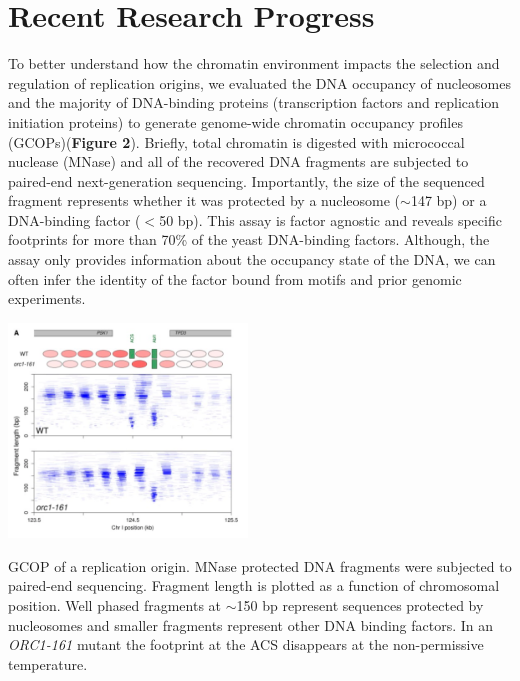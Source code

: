 \section{Recent Research Progress}
To better understand how the chromatin environment impacts the selection and regulation of replication origins, we evaluated the DNA occupancy of nucleosomes and the majority of DNA-binding proteins (\eg transcription factors and replication initiation proteins) to generate genome-wide chromatin occupancy profiles (GCOPs)({\color{dukeblue}\textbf{Figure 2}}). Briefly, total chromatin is digested with micrococcal nuclease (MNase) and all of the recovered DNA fragments are subjected to paired-end next-generation sequencing\citep{Belsky2015-li,Henikoff2011-vo}.  Importantly, the size of the sequenced fragment represents whether it was protected by a nucleosome ($\sim$147 bp) or a DNA-binding factor ($<$50 bp). This assay is factor agnostic and reveals specific footprints for more than 70\% of the yeast DNA-binding factors\citep{Henikoff2011-vo}.  Although, the assay only provides information about the occupancy state of the DNA, we can often infer the identity of the factor bound from motifs and prior genomic experiments.  
\begin{floatingfigure}[lt]{2.5in}
\vspace{-8mm}
\begin{center}
\includegraphics[width=2.5in]{r35_figures/orc_chromatin.png}
\end{center}
\vspace{3mm}
\caption{GCOP of a replication origin.  MNase protected DNA fragments were subjected to paired-end sequencing. Fragment length is plotted as a function of chromosomal position.  Well phased fragments at $\sim$150 bp represent sequences protected by nucleosomes and smaller fragments represent other DNA binding factors.  In an \textit{ORC1-161} mutant the footprint at the ACS disappears at the non-permissive temperature.}%
\end{floatingfigure}%
